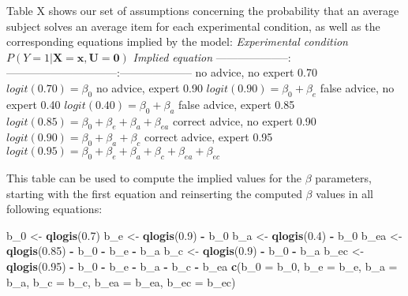 \documentclass[
  man,floatsintext]{apa6}
\newenvironment{Shaded}{\begin{snugshade}}{\end{snugshade}}
\newcommand{\AttributeTok}[1]{\textcolor[rgb]{0.13,0.29,0.53}{#1}}
\newcommand{\FloatTok}[1]{\textcolor[rgb]{0.00,0.00,0.81}{#1}}
\newcommand{\FunctionTok}[1]{\textcolor[rgb]{0.13,0.29,0.53}{\textbf{#1}}}
\newcommand{\NormalTok}[1]{#1}
\newcommand{\OtherTok}[1]{\textcolor[rgb]{0.56,0.35,0.01}{#1}}
\newcommand{\SpecialCharTok}[1]{\textcolor[rgb]{0.81,0.36,0.00}{\textbf{#1}}}
\begin{document}
Table X shows our set of assumptions concerning the probability that an average subject solves an average item for each experimental condition, as well as the corresponding equations implied by the model:
\textbar{} \emph{Experimental condition} \textbar{} \(P(Y=1|\mathbf{X=x}, \mathbf{U} = \mathbf{0})\) \textbar{} \emph{Implied equation} \textbar{}
\textbar--------------------\textbar:------------------------------:\textbar--------------------\textbar{}
\textbar{} no advice, no expert \textbar{} 0.70 \textbar{} \(logit(0.70) = \beta_0\) \textbar{}
\textbar{} no advice, expert \textbar{} 0.90 \textbar{} \(logit(0.90) = \beta_0 + \beta_e\) \textbar{}
\textbar{} false advice, no expert \textbar{} 0.40 \textbar{} \(logit(0.40) = \beta_0 + \beta_a\) \textbar{}
\textbar{} false advice, expert \textbar{} 0.85 \textbar{} \(logit(0.85) = \beta_0 + \beta_e + \beta_{a} + \beta_{ea}\) \textbar{}
\textbar{} correct advice, no expert \textbar{} 0.90 \textbar{} \(logit(0.90) = \beta_0 + \beta_a + \beta_c\) \textbar{}
\textbar{} correct advice, expert \textbar{} 0.95 \textbar{} \(logit(0.95) = \beta_0 + \beta_e + \beta_a + \beta_c + \beta_{ea} + \beta_{ec}\) \textbar{}

This table can be used to compute the implied values for the \(\beta\) parameters, starting with the first equation and reinserting the computed \(\beta\) values in all following equations:

\begin{Shaded}
\begin{Highlighting}[]
\NormalTok{b\_0 }\OtherTok{\textless{}{-}} \FunctionTok{qlogis}\NormalTok{(}\FloatTok{0.7}\NormalTok{)}
\NormalTok{b\_e }\OtherTok{\textless{}{-}} \FunctionTok{qlogis}\NormalTok{(}\FloatTok{0.9}\NormalTok{) }\SpecialCharTok{{-}}\NormalTok{ b\_0}
\NormalTok{b\_a }\OtherTok{\textless{}{-}} \FunctionTok{qlogis}\NormalTok{(}\FloatTok{0.4}\NormalTok{) }\SpecialCharTok{{-}}\NormalTok{ b\_0}
\NormalTok{b\_ea }\OtherTok{\textless{}{-}} \FunctionTok{qlogis}\NormalTok{(}\FloatTok{0.85}\NormalTok{) }\SpecialCharTok{{-}}\NormalTok{ b\_0 }\SpecialCharTok{{-}}\NormalTok{ b\_e }\SpecialCharTok{{-}}\NormalTok{ b\_a}
\NormalTok{b\_c }\OtherTok{\textless{}{-}} \FunctionTok{qlogis}\NormalTok{(}\FloatTok{0.9}\NormalTok{) }\SpecialCharTok{{-}}\NormalTok{ b\_0 }\SpecialCharTok{{-}}\NormalTok{ b\_a}
\NormalTok{b\_ec }\OtherTok{\textless{}{-}} \FunctionTok{qlogis}\NormalTok{(}\FloatTok{0.95}\NormalTok{) }\SpecialCharTok{{-}}\NormalTok{ b\_0 }\SpecialCharTok{{-}}\NormalTok{ b\_e }\SpecialCharTok{{-}}\NormalTok{ b\_a }\SpecialCharTok{{-}}\NormalTok{ b\_c }\SpecialCharTok{{-}}\NormalTok{ b\_ea}
\FunctionTok{c}\NormalTok{(}\AttributeTok{b\_0 =}\NormalTok{ b\_0, }\AttributeTok{b\_e =}\NormalTok{ b\_e, }\AttributeTok{b\_a =}\NormalTok{ b\_a, }\AttributeTok{b\_c =}\NormalTok{ b\_c, }\AttributeTok{b\_ea =}\NormalTok{ b\_ea, }\AttributeTok{b\_ec =}\NormalTok{ b\_ec)}
\end{Highlighting}
\end{Shaded}
\end{document}
